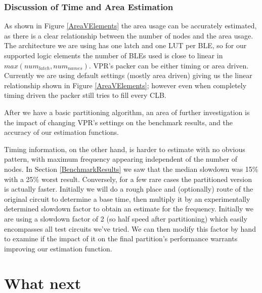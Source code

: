 \documentclass[12pt,final,oneside]{dwThesis} %
\begin{document}
\subsection{Discussion of Time and Area Estimation}
As shown in Figure \ref{AreaVElements} the area usage can be accurately estimated, as there is a clear relationship between the number of nodes and the area usage. The architecture we are using has one latch and one \ac{LUT} per \ac{BLE}, so for our supported logic elements the number of \acp{BLE} used is close to linear in $max(num_{latch}, num_{names})$. \ac{VPR}'s packer can be either timing or area driven. Currently we are using default settings (mostly area driven) giving us the linear relationship shown in Figure \ref{AreaVElements}; however even when completely timing driven the packer still tries to fill every \ac{CLB}\cite{AAPackThesis}.

After we have a basic partitioning algorithm, an area of further investigation is the impact of changing \ac{VPR}'s settings on the benchmark results, and the accuracy of our estimation functions.

Timing information, on the other hand, is harder to estimate with no obvious pattern, with maximum frequency appearing independent of the number of nodes. In Section \ref{BenchmarkResults} we saw that the median slowdown was 15\% with a 25\% worst result. Conversely, for a few rare cases the partitioned version is actually faster. Initially we will do a rough place and (optionally) route of the original circuit to determine a base time, then multiply it by an experimentally determined slowdown factor to obtain an estimate for the frequency. Initially we are using a slowdown factor of 2 (so half speed after partitioning) which easily encompasses all test circuits we've tried. We can then modify this factor by hand to examine if the impact of it on the final partition's performance warrants improving our estimation function.

\chapter{What next}
\end{document}
